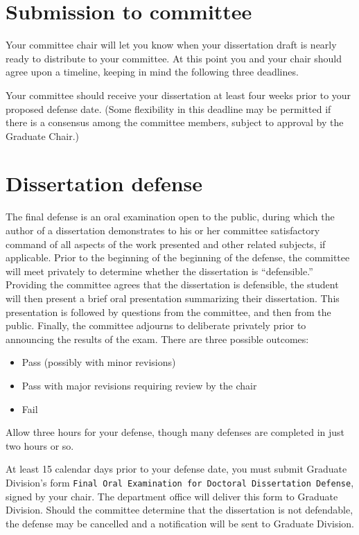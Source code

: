 \documentclass[
]{book}
\providecommand{\tightlist}{%
  \setlength{\itemsep}{0pt}\setlength{\parskip}{0pt}}
\begin{document}
\section{Submission to committee}\label{submission-to-committee}

Your committee chair will let you know when your dissertation draft is nearly ready to distribute to your committee. At this point you and your chair should agree upon a timeline, keeping in mind the following three deadlines.

Your committee should receive your dissertation at least four weeks prior to your proposed defense date. (Some flexibility in this deadline may be permitted if there is a consensus among the committee members, subject to approval by the Graduate Chair.)

\section{Dissertation defense}\label{dissertation-defense}

The final defense is an oral examination open to the public, during which the author of a dissertation demonstrates to his or her committee satisfactory command of all aspects of the work presented and other related subjects, if applicable. Prior to the beginning of the beginning of the defense, the committee will meet privately to determine whether the dissertation is ``defensible.'' Providing the committee agrees that the dissertation is defensible, the student will then present a brief oral presentation summarizing their dissertation. This presentation is followed by questions from the committee, and then from the public. Finally, the committee adjourns to deliberate privately prior to announcing the results of the exam. There are three possible outcomes:

\begin{itemize}
\tightlist
\item
  Pass (possibly with minor revisions)
\item
  Pass with major revisions requiring review by the chair
\item
  Fail
\end{itemize}

Allow three hours for your defense, though many defenses are completed in just two hours or so.

At least 15 calendar days prior to your defense date, you must submit Graduate Division's form \texttt{Final\ Oral\ Examination\ for\ Doctoral\ Dissertation\ Defense}, signed by your chair. The department office will deliver this form to Graduate Division. Should the committee determine that the dissertation is not defendable, the defense may be cancelled and a notification will be sent to Graduate Division.
\end{document}
